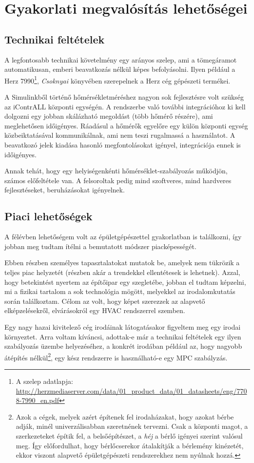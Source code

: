 \chapter{Gyakorlati megvalósítás lehetőségei}


\section{Technikai feltételek}\label{chap:feasibility-tech}

A legfontosabb technikai követelmény egy arányos szelep, ami a tömegáramot automatikusan, emberi beavatkozás nélkül képes befolyásolni. Ilyen például a Herz 7990\footnote{A szelep adatlapja: \url{http://herzmediaserver.com/data/01_product_data/01_datasheets/eng/7708-7990_en.pdf}}, \textit{Csoknyai \cite{Herz}} könyvében szerepelnek a Herz cég gépészeti termékei.

A Simulinkből történő hőmérsékletméréshez nagyon sok fejlesztésre volt szükség az iContrALL központi egységén. A rendszerbe való további integrációhoz ki kell dolgozni egy jobban skálázható megoldást (több hőmérő részére), ami meglehetősen időigényes. Ráadásul a hőmérők egyelőre egy külön központi egység közbeiktatásával kommunikálnak, ami nem teszi rugalmassá a használatot.
A beavatkozó jelek kiadása hasonló megfontolásokat igényel, integrációja ennek is időigényes.

Annak tehát, hogy egy helyiségenkénti hőmérséklet-szabályozás működjön, számos előfeltétele van. A felsoroltak pedig mind szoftveres, mind hardveres fejlesztéseket, beruházásokat igényelnek.

\section{Piaci lehetőségek}

A félévben lehetőségem volt az épületgépészettel gyakorlatban is találkozni, így jobban meg tudtam ítélni a bemutatott módszer piacképességét.

Ebben részben személyes tapasztalatokat mutatok be, amelyek nem tükrözik a teljes piac helyzetét (részben akár a trendekkel ellentétesek is lehetnek). Azzal, hogy betekintést nyertem az építőipar egy szegletébe, jobban el tudtam képzelni, mi a fizikai tartalom a sok technológia mögött, melyekkel az irodalomkutatás során találkoztam. Célom az volt, hogy képet szerezzek az alapvető elképzelésekről, elvárásokról egy HVAC rendszerrel szemben.

Egy nagy hazai kivitelező cég irodáinak látogatásakor figyeltem meg egy irodai környeztet. Arra voltam kíváncsi, adottak-e már a technikai feltételek egy ilyen szabályozás üzembe helyezéséhez, a konkrét irodában például az, hogy nagyobb átépítés nélkül\footnote{Azok a cégek, melyek azért építenek fel irodaházakat, hogy azokat bérbe adják, minél univerzálisabban szeretnének tervezni. Csak a központi magot, a szerkezeteket építik fel, a belsőépítészet, a \textit{héj} a bérlő igényei szerint valósul meg. Így előfordulhat, hogy bérlőcserekor átalakítják a bérlemény kinézetét, ekkor viszont alapvető épületgépészeti rendszerekhez nem nyúlnak hozzá.}, egy kész rendszerre is használható-e egy MPC szabályzás.

